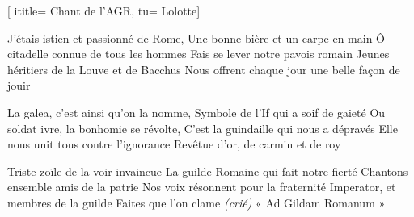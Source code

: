  [
ititle= {Chant de l'AGR},
tu= {Lolotte}]


\beginverse
J'étais istien et passionné de Rome,
Une bonne bière et un carpe en main 
Ô citadelle connue de tous les hommes 
Fais se lever notre pavois romain 
Jeunes héritiers de la Louve et de Bacchus
Nous offrent chaque jour une belle façon de jouir 
\endverse

\beginverse
La galea, c'est ainsi qu'on la nomme,
Symbole de l'If qui a soif de gaieté 
Ou soldat ivre, la bonhomie se révolte,
C'est la guindaille qui nous a dépravés 
Elle nous unit tous contre l'ignorance
Revêtue d'or, de carmin et de roy 
\endverse

\beginverse
Triste zoïle de la voir invaincue 
La guilde Romaine qui fait notre fierté 
Chantons ensemble amis de la patrie 
Nos voix résonnent pour la fraternité 
Imperator, et membres de la guilde
Faites que l'on clame \emph {(crié)} « Ad Gildam Romanum » 
\endverse

\endsong